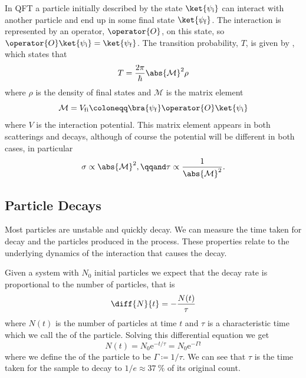 \documentclass[fleqn]{NotesClass}
\newcommand*{\e}{\mathrm{e}}
\newcommand*{\matrixelement}{\mathcal{M}}
\begin{document}
    In QFT a particle initially described by the state \(\ket{\psi_{\mathrm{i}}}\) can interact with another particle and end up in some final state \(\ket{\psi_{\mathrm{f}}}\).
    The interaction is represented by an operator, \(\operator{O}\), on this state, so \(\operator{O}\ket{\psi_{\mathrm{i}}} = \ket{\psi_{\mathrm{f}}}\).
    The transition probability, \(T\), is given by , which states that 
    \begin{equation}
        T= \frac{2\pi}{\hbar} \abs{\matrixelement}^2\rho
    \end{equation}
    where \(\rho\) is the density of final states and \(\matrixelement\) is the matrix element
    \begin{equation}
        \matrixelement = V_{\mathrm{f\/i}} \coloneqq \bra{\psi_{\mathrm{f}}} \operator{O} \ket{\psi_{\mathrm{i}}}
    \end{equation}
    where \(V\) is the interaction potential.
    This matrix element appears in both scatterings and decays, although of course the potential will be different in both cases, in particular
    \begin{equation}
        \sigma \propto \abs{\matrixelement}^2, \qqand \tau \propto \frac{1}{\abs{\matrixelement}^2}.
    \end{equation}

    \subsection{Particle Decays}
    Most particles are unstable and quickly decay.
    We can measure the time taken for decay and the particles produced in the process.
    These properties relate to the underlying dynamics of the interaction that causes the decay.
    
    Given a system with \(N_0\) initial particles we expect that the decay rate is proportional to the number of particles, that is
    \begin{equation}
        \diff{N}{t} = -\frac{N(t)}{\tau}
    \end{equation}
    where \(N(t)\) is the number of particles at time \(t\) and \(\tau\) is a characteristic time which we call the  of the particle.
    Solving this differential equation we get
    \begin{equation}
        N(t) = N_0\e^{-t/\tau} = N_0\e^{-\Gamma t}
    \end{equation}
    where we define the  of the particle to be \(\Gamma \coloneqq 1/\tau\).
    We can see that \(\tau\) is the time taken for the sample to decay to \(1/e \approx \qty{37}{\percent}\) of its original count. 
    
\end{document}
